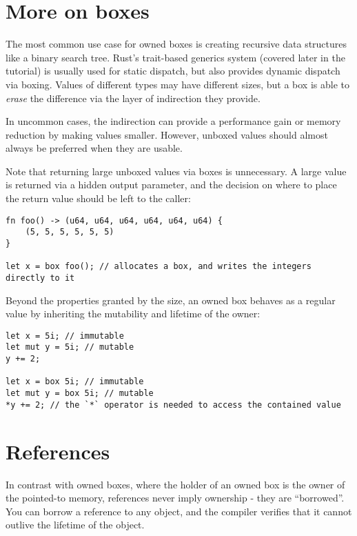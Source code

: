 \documentclass[]{article}
\begin{document}
\section{More on boxes}\label{more-on-boxes}

The most common use case for owned boxes is creating recursive data
structures like a binary search tree. Rust's trait-based generics system
(covered later in the tutorial) is usually used for static dispatch, but
also provides dynamic dispatch via boxing. Values of different types may
have different sizes, but a box is able to \emph{erase} the difference
via the layer of indirection they provide.

In uncommon cases, the indirection can provide a performance gain or
memory reduction by making values smaller. However, unboxed values
should almost always be preferred when they are usable.

Note that returning large unboxed values via boxes is unnecessary. A
large value is returned via a hidden output parameter, and the decision
on where to place the return value should be left to the caller:

\begin{verbatim}
fn foo() -> (u64, u64, u64, u64, u64, u64) {
    (5, 5, 5, 5, 5, 5)
}

let x = box foo(); // allocates a box, and writes the integers directly to it
\end{verbatim}

Beyond the properties granted by the size, an owned box behaves as a
regular value by inheriting the mutability and lifetime of the owner:

\begin{verbatim}
let x = 5i; // immutable
let mut y = 5i; // mutable
y += 2;

let x = box 5i; // immutable
let mut y = box 5i; // mutable
*y += 2; // the `*` operator is needed to access the contained value
\end{verbatim}

\section{References}\label{references-1}

In contrast with owned boxes, where the holder of an owned box is the
owner of the pointed-to memory, references never imply ownership - they
are ``borrowed''. You can borrow a reference to any object, and the
compiler verifies that it cannot outlive the lifetime of the object.
\end{document}

